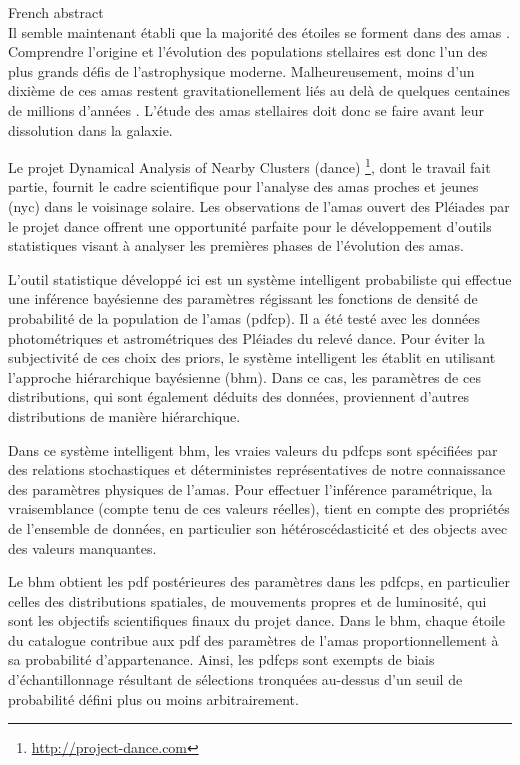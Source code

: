 {\LARGE French abstract}\\


Il semble maintenant établi que la majorité des étoiles se forment dans des amas \citep{2000AJ....120.3139C, 2003AJ....126.1916P,2003ARA&A..41...57L}. Comprendre l'origine et l'évolution des populations stellaires est donc l'un des plus grands défis de l'astrophysique moderne. Malheureusement, moins d'un dixième de ces amas restent gravitationellement liés au delà de quelques centaines de millions d'années \citep{2003ARA&A..41...57L}. L’étude des amas stellaires doit donc se faire avant leur dissolution dans la galaxie.

Le projet Dynamical Analysis of Nearby Clusters (\gls{dance}) \footnote{\url{http://project-dance.com}}, dont le travail fait partie, fournit le cadre scientifique pour l'analyse des amas proches et jeunes (\gls{nyc}) dans le voisinage solaire. Les observations de l'amas ouvert des Pléiades par le projet \gls{dance} offrent une opportunité parfaite pour le développement d'outils statistiques visant à analyser les premières phases de l'évolution des amas.

L'outil statistique développé ici est un système intelligent probabiliste qui effectue une inférence bayésienne des paramètres régissant les fonctions de densité de probabilité  de la population de l'amas (\gls{pdfcp}). Il a été testé avec les données photométriques et astrométriques des Pléiades du relevé \gls{dance}. Pour éviter la subjectivité de ces choix des priors, le système intelligent les établit en utilisant l'approche hiérarchique bayésienne (\gls{bhm}). Dans ce cas, les paramètres de ces distributions, qui sont également déduits des données, proviennent d'autres distributions de manière hiérarchique.

Dans ce système intelligent \gls{bhm}, les vraies valeurs du \glspl{pdfcp} sont spécifiées par des relations stochastiques et déterministes représentatives de notre connaissance des paramètres physiques de l'amas. Pour effectuer l'inférence paramétrique, la vraisemblance (compte tenu de ces valeurs réelles), tient en compte des propriétés de l'ensemble de données, en particulier son hétéroscédasticité et des objects avec des valeurs manquantes.

Le \gls{bhm} obtient les \gls{pdf} postérieures des paramètres dans les \glspl{pdfcp}, en particulier celles des distributions spatiales, de mouvements propres et de luminosité, qui sont les objectifs scientifiques finaux du projet \gls{dance}. Dans le \gls{bhm}, chaque étoile du catalogue contribue aux \gls{pdf} des paramètres de l'amas proportionnellement à sa probabilité d'appartenance. Ainsi, les \glspl{pdfcp} sont exempts de biais d'échantillonnage résultant de sélections tronquées au-dessus d'un seuil de probabilité défini plus ou moins arbitrairement.

